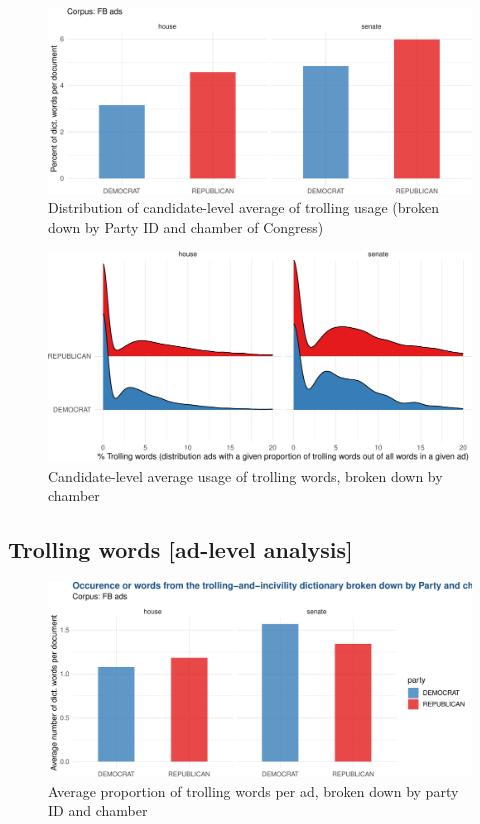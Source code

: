 \documentclass[
  12pt,
]{article}
\begin{document}
\begin{figure}
\centering
\includegraphics{figsFB/unnamed-chunk-15-1.pdf}
\caption{\label{fig:unnamed-chunk-15}Distribution of candidate-level average of trolling usage (broken down by Party ID and chamber of Congress)}
\end{figure}

\begin{figure}
\centering
\includegraphics{figsFB/unnamed-chunk-16-1.pdf}
\caption{\label{fig:unnamed-chunk-16}Candidate-level average usage of trolling words, broken down by chamber}
\end{figure}

\pagebreak
\clearpage

\hypertarget{trolling-words-ad-level-analysis}{%
\subsection{Trolling words {[}ad-level analysis{]}}\label{trolling-words-ad-level-analysis}}

\begin{figure}
\centering
\includegraphics{figsFB/unnamed-chunk-17-1.pdf}
\caption{\label{fig:unnamed-chunk-17}Average proportion of trolling words per ad, broken down by party ID and chamber}
\end{figure}
\end{document}
